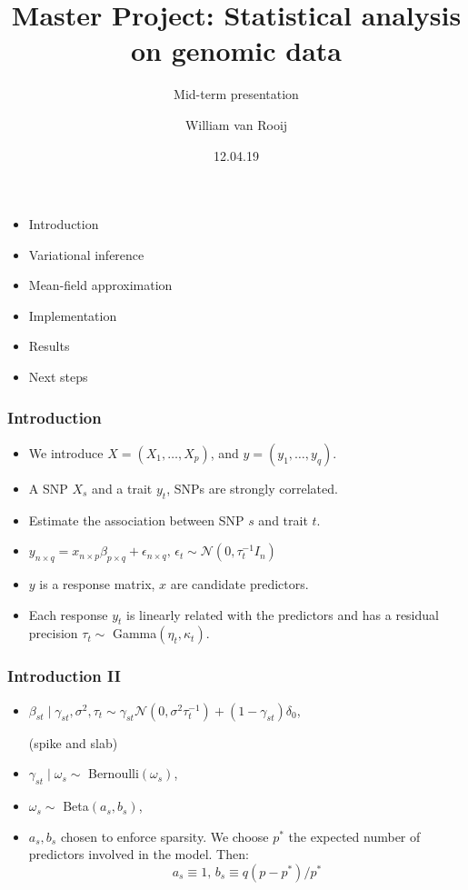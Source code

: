 \documentclass{beamer}
\begin{document}
\title{Master Project: Statistical analysis on genomic data}
\subtitle{Mid-term presentation}
\author{William van Rooij}
\date{12.04.19}
\maketitle
\begin{frame}
\begin{itemize}
\item Introduction
\item Variational inference
\item Mean-field approximation
\item Implementation
\item Results
\item Next steps
\end{itemize}
\end{frame}
\begin{frame}
\frametitle{Introduction}
\begin{itemize}
\item We introduce $X = (X_1,\ldots,X_p)$, and $y = (y_1,\ldots,y_q)$.
\item A SNP $X_s$ and a trait $y_t$, SNPs are strongly correlated.
\item Estimate the association between SNP $s$ and trait $t$.
\item $y_{n\times q} = x_{n\times p}\beta_{p \times q} + \epsilon_{n\times q}\text{, }\epsilon_t \sim \mathcal{N}(0,\tau_t^{-1}I_n)$
\item $y$ is a response matrix, $x$ are candidate predictors.

\item Each response $y_t$ is linearly related with the predictors and has a residual precision $\tau_t \sim $ Gamma$(\eta_t, \kappa_t)$.

\end{itemize}
\end{frame}
\begin{frame}
\frametitle{Introduction II}
\begin{itemize}

\item $\beta_{st}\mid\gamma_{st},\sigma^2,\tau_t \sim \gamma_{st}\mathcal{N}(0,\sigma^2\tau_t^{-1})+(1-\gamma_{st})\delta_0$,

(spike and slab)

\item $\gamma_{st} \mid \omega_{s} \sim $ Bernoulli$(\omega_s)$,

\item $\omega_s \sim $ Beta$(a_s,b_s)$,
\item $a_s, b_s$ chosen to enforce sparsity. We choose $p^*$ the expected number of predictors involved in the model. Then:
$$
a_s \equiv 1\text{, }b_s \equiv q(p-p^*)/p^*
$$

\end{itemize}

\end{frame}
\end{document}
